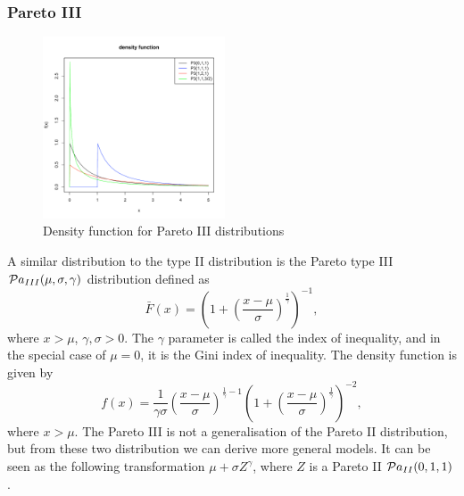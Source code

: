 \subsubsection{Pareto III}
\begin{figure}
  \vspace{-20pt}
  \begin{center}
    \includegraphics[width=0.48\textwidth]{img/pareto3zoom}
  \end{center}
  \vspace{-20pt}  
  \caption{Density function for Pareto III distributions}
  \vspace{-20pt}  
\end{figure}
A similar distribution to the type II distribution is the Pareto type III $\mathcal Pa_{III}(\mu, \sigma, \gamma)$ distribution defined as
$$
\bar F(x)  = \left(1+\left(\frac{x-\mu}{\sigma}\right)^{\frac{1}{\gamma}}\right)^{-1},
$$
where $x>\mu$, $\gamma,\sigma>0$. The $\gamma$ parameter is called the index of inequality, and in the special case of $\mu=0$, it is the Gini index of inequality. The density function is given by
$$
f(x)  = \frac{1}{\gamma\sigma} \left(\frac{x-\mu}{\sigma}\right)^{\frac{1}{\gamma}-1} \left(1+\left(\frac{x-\mu}{\sigma}\right)^{\frac{1}{\gamma}}\right)^{-2},
$$
where $x>\mu$. The Pareto III is not a generalisation of the Pareto II distribution, but from these two distribution we can derive more general models. It can be seen as the following transformation $\mu+\sigma Z^\gamma$, where $Z$ is a Pareto II $\mathcal Pa_{II}(0, 1, 1)$.

